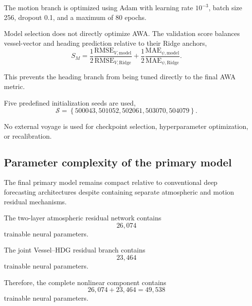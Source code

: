 The motion branch is optimized using Adam with learning rate $10^{-3}$, batch size 256, dropout 0.1, and a maximum of 80 epochs.

Model selection does not directly optimize AWA. The validation score balances vessel-vector and heading prediction relative to their Ridge anchors,
\begin{equation}
S_M
=
\frac{1}{2}
\frac{
\mathrm{RMSE}_{V,\mathrm{model}}
}{
\mathrm{RMSE}_{V,\mathrm{Ridge}}
}
+
\frac{1}{2}
\frac{
\mathrm{MAE}_{\psi,\mathrm{model}}
}{
\mathrm{MAE}_{\psi,\mathrm{Ridge}}
}.
\label{eq:motion_validation_score}
\end{equation}

This prevents the heading branch from being tuned directly to the final AWA metric.

Five predefined initialization seeds are used,
\begin{equation}
\mathcal S
=
\left\{
500043,
501052,
502061,
503070,
504079
\right\}.
\label{eq:seed_set}
\end{equation}

No external voyage is used for checkpoint selection, hyperparameter optimization, or recalibration.

\subsection{Parameter complexity of the primary model}
\label{subsec:primary_complexity}

The final primary model remains compact relative to conventional deep forecasting architectures despite containing separate atmospheric and motion residual mechanisms.

The two-layer atmospheric residual network contains
\begin{equation}
\boxed{
26{,}074
}
\end{equation}
trainable neural parameters.

The joint Vessel--HDG residual branch contains
\begin{equation}
\boxed{
23{,}464
}
\end{equation}
trainable neural parameters.

Therefore, the complete nonlinear component contains
\begin{equation}
26{,}074
+
23{,}464
=
\boxed{
49{,}538
}
\label{eq:total_neural_params}
\end{equation}
trainable neural parameters.

